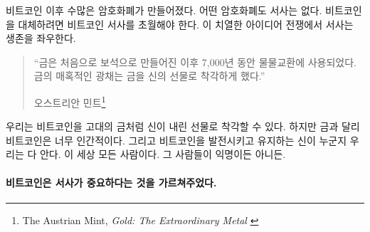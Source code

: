 비트코인 이후 수많은 암호화폐가 만들어졌다. 
어떤 암호화폐도 서사는 없다.
비트코인을 대체하려면 비트코인 서사를 초월해야 한다. 
이 치열한 아이디어 전쟁에서 서사는 생존을 좌우한다.

\begin{quotation}\begin{samepage}
\enquote{금은 처음으로 보석으로 만들어진 이후 7,000년 동안 물물교환에 사용되었다. 금의 매혹적인 광채는 금을 신의 선물로 착각하게 했다.}
\begin{flushright} 오스트리안 민트\footnote{The Austrian Mint, \textit{Gold: The Extraordinary Metal} \cite{gold-gift-gods}}
\end{flushright}\end{samepage}\end{quotation}

우리는 비트코인을 고대의 금처럼 신이 내린 선물로 착각할 수 있다. 
하지만 금과 달리 비트코인은 너무 인간적이다. 
그리고 비트코인을 발전시키고 유지하는 신이 누군지 우리는 다 안다. 
이 세상 모든 사람이다. 그 사람들이 익명이든 아니든.

\paragraph{비트코인은 서사가 중요하다는 것을 가르쳐주었다.}

%
%
%
%
